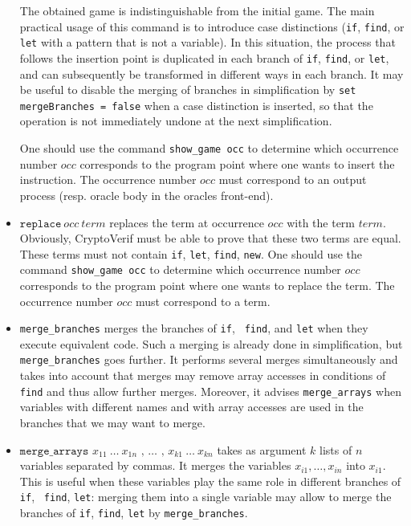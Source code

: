 \documentclass{article}
\begin{document}
\begin{itemize}
The obtained game is indistinguishable from the initial game.
The main practical usage of this command is to introduce case
distinctions ({\tt if}, {\tt find}, or {\tt let} with a pattern that
is not a variable). In this situation, the process that follows the
insertion point is duplicated in each branch of {\tt if}, {\tt find},
or {\tt let}, and can subsequently be transformed in different ways in
each branch. 
%
It may be useful to disable the merging of branches in simplification
by \texttt{set mergeBranches = false} when a case distinction is
inserted, so that the operation is not immediately undone at the next
simplification.

One should use the command \texttt{show\string_game occ} to determine
which occurrence number $occ$ corresponds to the program point where
one wants to insert the instruction. The occurrence number $occ$ must
correspond to an output process (resp. oracle body in the oracles
front-end).

\item $\texttt{replace}\ occ\ term$ replaces the term at occurrence
  $occ$ with the term $term$. Obviously, CryptoVerif must be able to
  prove that these two terms are equal.
  These terms must not contain \texttt{if}, \texttt{let},
  \texttt{find}, \texttt{new}.
One should use the command \texttt{show\string_game occ} to determine
which occurrence number $occ$ corresponds to the program point where
one wants to replace the term. The occurrence number $occ$ must
correspond to a term.

\item \texttt{merge\_branches} merges the branches of {\tt if}, {\tt
    find}, and {\tt let} when they execute equivalent code. Such a
  merging is already done in simplification, but
  \texttt{merge\_branches} goes further. It performs several merges
  simultaneously and takes into account that merges may remove array
  accesses in conditions of {\tt find} and thus allow further
  merges. Moreover, it advises {\tt merge\_arrays} when variables with
  different names and with array accesses are used in the branches
  that we may want to merge.

\item $\texttt{merge\_arrays } x_{11}\ \ldots\ x_{1n} \texttt{ , }
  \ldots \texttt{ , } x_{k1}\ \ldots\ x_{kn}$ takes as argument $k$
  lists of $n$ variables separated by commas. It merges the variables
  $x_{i1}, \ldots, x_{in}$ into $x_{i1}$. This is useful when these
  variables play the same role in different branches of {\tt if}, {\tt
    find}, {\tt let}: merging them into a single variable may allow to
  merge the branches of {\tt if}, {\tt find}, {\tt let} by
  \texttt{merge\_branches}. 


\end{itemize}
\end{document}
